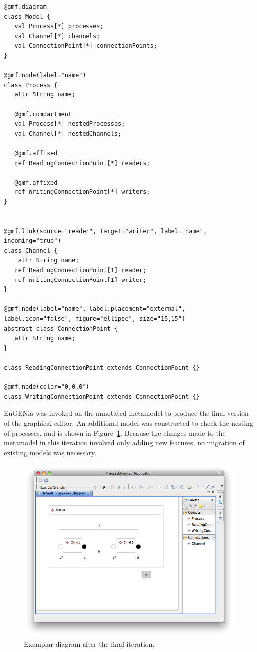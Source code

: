 \begin{lstlisting}[caption=The annotated process-oriented metamodel after the final iteration, label=lst:po_it6_mm, language=Emfatic]
@gmf.diagram
class Model {
   val Process[*] processes;
   val Channel[*] channels;
   val ConnectionPoint[*] connectionPoints;
}

@gmf.node(label="name")
class Process {
   attr String name;

   @gmf.compartment
   val Process[*] nestedProcesses;
   val Channel[*] nestedChannels;
      
   @gmf.affixed
   ref ReadingConnectionPoint[*] readers;
   
   @gmf.affixed
   ref WritingConnectionPoint[*] writers; 
}


@gmf.link(source="reader", target="writer", label="name", incoming="true")
class Channel { 
	attr String name;
   ref ReadingConnectionPoint[1] reader;
   ref WritingConnectionPoint[1] writer;
}

@gmf.node(label="name", label.placement="external", label.icon="false", figure="ellipse", size="15,15")
abstract class ConnectionPoint {
   attr String name;
}

class ReadingConnectionPoint extends ConnectionPoint {}

@gmf.node(color="0,0,0")
class WritingConnectionPoint extends ConnectionPoint {}
\end{lstlisting}

EuGENia was invoked on the annotated metamodel to produce the final version of the graphical editor. An additional model was constructed to check the nesting of processes, and is shown in Figure~\ref{fig:po_it6_model}. Because the changes made to the metamodel in this iteration involved only adding new features, no migration of existing models was necessary.

\begin{figure}[htbp]
	\centering
		\includegraphics[scale=0.5]{A.2.ProcessOriented/images/6_model.png}
	\caption{Exemplar diagram after the final iteration.}
	\label{fig:po_it6_model}
\end{figure}

